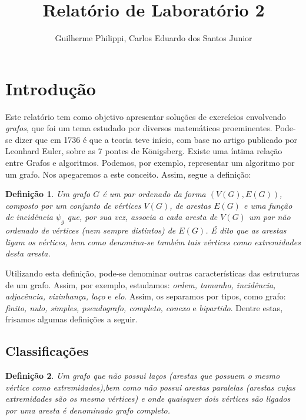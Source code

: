 \documentclass[a4paper,12pt]{article}
\title{Relatório de Laboratório 2}
\author{Guilherme Philippi, Carlos Eduardo dos Santos Junior}
\newtheorem{definicao}{Definição}[section]
\begin{document}
\maketitle
\tableofcontents

\section{Introdução}

Este relatório tem como objetivo apresentar soluções de exercícios envolvendo \textit{grafos}, que foi um tema estudado por diversos matemáticos proeminentes. Pode-se dizer que em 1736 é que a teoria teve início, com base no artigo publicado por Leonhard Euler, sobre as 7 pontes de Königsberg. Existe uma íntima relação entre Grafos e algoritmos. Podemos, por exemplo, representar um algoritmo por um grafo. Nos apegaremos a este conceito. Assim, segue a definição:

\begin{definicao}
	Um grafo $G$ é um par ordenado da forma $(V(G),E(G))$, composto por um conjunto de \textit{vértices} $V(G)$, de arestas $E(G)$ e uma \textit{função de incidência} $\psi_{g}$ que, por sua vez, associa a cada aresta de $V(G)$ um par não ordenado de vértices (nem sempre distintos) de $E(G)$. É dito que as arestas \textit{ligam} os vértices, bem como denomina-se também tais vértices como \textit{extremidades} desta aresta.
\end{definicao}

Utilizando esta definição, pode-se denominar outras características das estruturas de um grafo. Assim, por exemplo, estudamos: \textit{ordem, tamanho, incidência, adjacência, vizinhança, laço} e \textit{elo}. Assim, os separamos por tipos, como grafo: \textit{finito, nulo, simples, pseudografo, completo, conexo} e \textit{bipartido}. Dentre estas, frisamos algumas definições a seguir.

\subsection{Classificações}

\begin{definicao}
	Um grafo que não possui laços (arestas que possuem o mesmo vértice como extremidades),bem como não possui arestas paralelas (arestas cujas extremidades são os mesmo vértices) e onde quaisquer dois vértices são ligados por uma aresta é denominado \textit{grafo completo}.
\end{definicao}
\end{document}
